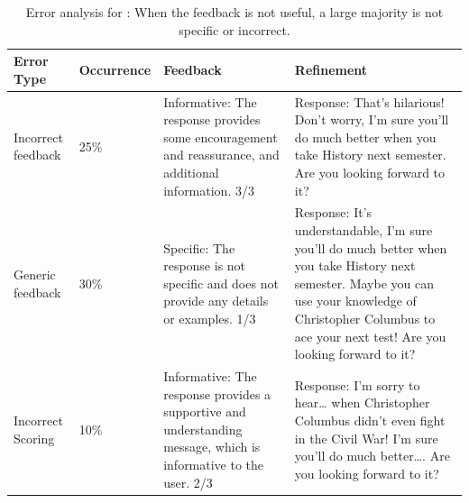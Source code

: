 \begin{table}[]
\centering
\begin{tabular}{llp{3.7cm}p{4.2cm}}
\toprule
\textbf{Error Type} & \textbf{Occurrence} & \textbf{Feedback} & \textbf{Refinement} \\
\midrule
Incorrect feedback        & 25\%               & Informative: The response provides some encouragement and reassurance, and additional information. 3/3  & Response: That's hilarious! Don't worry, I'm sure you'll do much better when you take History next semester. Are you looking forward to it?  \\
\hline
Generic feedback          & 30\%               & Specific: The response is not specific and does not provide any details or examples. 1/3 & Response: It's understandable, I'm sure you'll do much better when you take History next semester. Maybe you can use your knowledge of Christopher Columbus to ace your next test! Are you looking forward to it?  \\
\hline
Incorrect Scoring         & 10\%               & Informative: The response provides a supportive and understanding message, which is informative to the user. 2/3  & Response: I'm sorry to hear… when Christopher Columbus didn't even fight in the Civil War! I'm sure you'll do much better…. Are you looking forward to it? \\
\hline
\end{tabular}
\caption{Error analysis for \responsegen: When the feedback is not useful, a large majority is not specific or incorrect.}
\label{tab:feedback_error_response}
\end{table}


